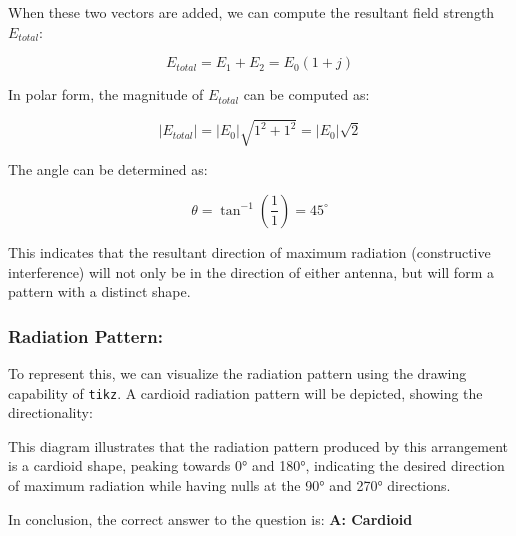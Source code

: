 When these two vectors are added, we can compute the resultant field strength \( E_{total} \):

\[
E_{total} = E_1 + E_2 = E_0(1 + j)
\]

In polar form, the magnitude of \( E_{total} \) can be computed as:

\[
|E_{total}| = |E_0| \sqrt{1^2 + 1^2} = |E_0| \sqrt{2} 
\]

The angle can be determined as:

\[
\theta = \tan^{-1}\left(\frac{1}{1}\right) = 45^\circ
\]

This indicates that the resultant direction of maximum radiation (constructive interference) will not only be in the direction of either antenna, but will form a pattern with a distinct shape.

\subsubsection*{Radiation Pattern:}

To represent this, we can visualize the radiation pattern using the drawing capability of \texttt{tikz}. A cardioid radiation pattern will be depicted, showing the directionality:


This diagram illustrates that the radiation pattern produced by this arrangement is a cardioid shape, peaking towards 0° and 180°, indicating the desired direction of maximum radiation while having nulls at the 90° and 270° directions.

In conclusion, the correct answer to the question is:
\textbf{A: Cardioid}
